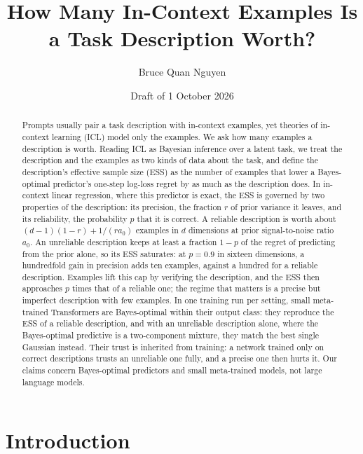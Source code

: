 \documentclass[10pt]{article}
\title{How Many In-Context Examples Is a Task Description Worth?}
\author{Bruce Quan Nguyen \\ \todo{Affiliation}}
\date{Draft of 1 October 2026}
\begin{document}
\maketitle

\begin{abstract}
Prompts usually pair a task description with in-context examples, yet theories of in-context learning (ICL) model only the examples. We ask how many examples a description is worth. Reading ICL as Bayesian inference over a latent task, we treat the description and the examples as two kinds of data about the task, and define the description's effective sample size (ESS) as the number of examples that lower a Bayes-optimal predictor's one-step log-loss regret by as much as the description does. In in-context linear regression, where this predictor is exact, the ESS is governed by two properties of the description: its precision, the fraction $r$ of prior variance it leaves, and its reliability, the probability $p$ that it is correct. A reliable description is worth about $(d-1)(1-r) + 1/(r a_0)$ examples in $d$ dimensions at prior signal-to-noise ratio $a_0$. An unreliable description keeps at least a fraction $1-p$ of the regret of predicting from the prior alone, so its ESS saturates: at $p = 0.9$ in sixteen dimensions, a hundredfold gain in precision adds ten examples, against a hundred for a reliable description. Examples lift this cap by verifying the description, and the ESS then approaches $p$ times that of a reliable one; the regime that matters is a precise but imperfect description with few examples. In one training run per setting, small meta-trained Transformers are Bayes-optimal within their output class: they reproduce the ESS of a reliable description, and with an unreliable description alone, where the Bayes-optimal predictive is a two-component mixture, they match the best single Gaussian instead. Their trust is inherited from training: a network trained only on correct descriptions trusts an unreliable one fully, and a precise one then hurts it. Our claims concern Bayes-optimal predictors and small meta-trained models, not large language models.
\end{abstract}

\section{Introduction}
\end{document}
